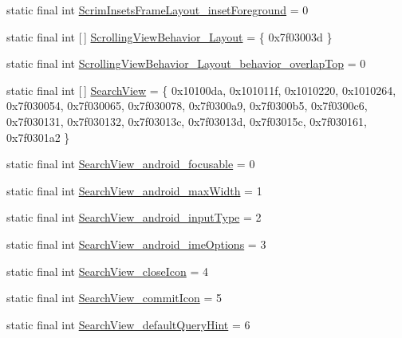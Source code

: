 \begin{DoxyCompactItemize}
\item 
static final int \mbox{\hyperlink{classandroid_1_1support_1_1design_1_1_r_1_1styleable_a843fb1a1e42f587cac983facff0ae7c0}{Scrim\+Insets\+Frame\+Layout\+\_\+inset\+Foreground}} = 0
\item 
static final int \mbox{[}$\,$\mbox{]} \mbox{\hyperlink{classandroid_1_1support_1_1design_1_1_r_1_1styleable_a4277e39803c295c7c9cdbc5e862840c3}{Scrolling\+View\+Behavior\+\_\+\+Layout}} = \{ 0x7f03003d \}
\item 
static final int \mbox{\hyperlink{classandroid_1_1support_1_1design_1_1_r_1_1styleable_ace54124d9ddc1d6c08aa85a9053cd0fb}{Scrolling\+View\+Behavior\+\_\+\+Layout\+\_\+behavior\+\_\+overlap\+Top}} = 0
\item 
static final int \mbox{[}$\,$\mbox{]} \mbox{\hyperlink{classandroid_1_1support_1_1design_1_1_r_1_1styleable_a8f7e72dc1bf854e14c1be7dbc1cb7392}{Search\+View}} = \{ 0x10100da, 0x101011f, 0x1010220, 0x1010264, 0x7f030054, 0x7f030065, 0x7f030078, 0x7f0300a9, 0x7f0300b5, 0x7f0300c6, 0x7f030131, 0x7f030132, 0x7f03013c, 0x7f03013d, 0x7f03015c, 0x7f030161, 0x7f0301a2 \}
\item 
static final int \mbox{\hyperlink{classandroid_1_1support_1_1design_1_1_r_1_1styleable_a7836ab26d5f216a4c25fe349d89f98ee}{Search\+View\+\_\+android\+\_\+focusable}} = 0
\item 
static final int \mbox{\hyperlink{classandroid_1_1support_1_1design_1_1_r_1_1styleable_a6ba96e60e04c3a15961ba0214a0b795b}{Search\+View\+\_\+android\+\_\+max\+Width}} = 1
\item 
static final int \mbox{\hyperlink{classandroid_1_1support_1_1design_1_1_r_1_1styleable_ad64fde9d1d7d03e5623d79d10fbf61f3}{Search\+View\+\_\+android\+\_\+input\+Type}} = 2
\item 
static final int \mbox{\hyperlink{classandroid_1_1support_1_1design_1_1_r_1_1styleable_a9adc851f512d660507837fbfd7465fbd}{Search\+View\+\_\+android\+\_\+ime\+Options}} = 3
\item 
static final int \mbox{\hyperlink{classandroid_1_1support_1_1design_1_1_r_1_1styleable_adb39ddc97b14392a94bc635c4319f0dd}{Search\+View\+\_\+close\+Icon}} = 4
\item 
static final int \mbox{\hyperlink{classandroid_1_1support_1_1design_1_1_r_1_1styleable_aa78a05d45b61ecaac65cc0990d6c8b85}{Search\+View\+\_\+commit\+Icon}} = 5
\item 
static final int \mbox{\hyperlink{classandroid_1_1support_1_1design_1_1_r_1_1styleable_ae831225e4e21b799547d4dcb8591effa}{Search\+View\+\_\+default\+Query\+Hint}} = 6

\end{DoxyCompactItemize}
